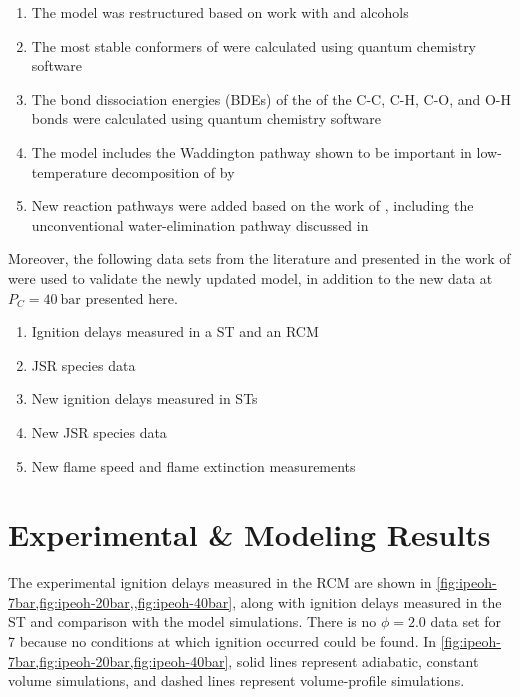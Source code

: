\documentclass[../main.tex]{subfiles}
\begin{document}
\begin{enumerate}
\item The model was restructured based on work with  and 
      alcohols \cite{Sarathy2012, Heufer2012a}
\item The most stable conformers of \iPeOH{} were calculated using
      quantum chemistry software
\item The bond dissociation energies (BDEs) of the of the C-C, C-H, C-O, and O-H bonds were calculated
      using quantum chemistry software
\item The model includes the Waddington pathway shown to be important in
      low\hyp{}temperature decomposition of \iPeOH{} by \textcite{Welz2012}
\item New reaction pathways were added based on the work of \textcite{Welz2012,
      Welz2013}, including the unconventional water-elimination pathway discussed
      in \textcite{Welz2013}
\end{enumerate}

Moreover, the following data sets from the literature and presented in
the work of \textcite{Sarathy2013} were used to validate the newly
updated model, in addition to the new data at $P_C=\SI{40}{\bar}$ presented here.

\begin{enumerate}
\item Ignition delays measured in a ST and an RCM \cite{Tang2013, Tsujimura2012}
\item JSR species data \cite{Dayma2011}
\item New ignition delays measured in STs \cite{Sarathy2013}
\item New JSR species data \cite{Sarathy2013}
\item New flame speed and flame extinction measurements \cite{Sarathy2013}
\end{enumerate}

\section{Experimental \& Modeling Results}
\label{sec:ipeoh-results}

The experimental ignition delays measured in the RCM are shown in
\cref{fig:ipeoh-7bar,fig:ipeoh-20bar,,fig:ipeoh-40bar}, along with
ignition delays measured in the ST and comparison with
the model simulations. There is no $\phi=2.0$ data set for \SI{7}{\atmosphere}
because no conditions at which ignition occurred could be found.
In \cref{fig:ipeoh-7bar,fig:ipeoh-20bar,fig:ipeoh-40bar}, solid
lines represent adiabatic, constant volume simulations, and dashed
lines represent volume-profile simulations.
\end{document}
